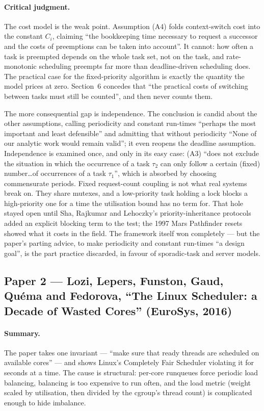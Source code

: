 \paragraph{Critical judgment.}
The cost model is the weak point. Assumption (A4) folds context-switch cost into the
constant $C_i$, claiming ``the bookkeeping time necessary to request a successor and the
costs of preemptions can be taken into account''. It cannot: how often a task is
preempted depends on the whole task set, not on the task, and rate-monotonic scheduling
preempts far more than deadline-driven scheduling does. The practical case for the
fixed-priority algorithm is exactly the quantity the model prices at zero. Section~6
concedes that ``the practical costs of switching between tasks must still be counted'',
and then never counts them.

The more consequential gap is independence. The conclusion is candid about the other
assumptions, calling periodicity and constant run-times ``perhaps the most important and
least defensible'' and admitting that without periodicity ``None of our analytic work
would remain valid''; it even reopens the deadline assumption. Independence is examined
once, and only in its easy case: (A3) ``does not exclude the situation in which the
occurrence of a task $\tau_2$ can only follow a certain (fixed) number\ldots of
occurrences of a task $\tau_1$'', which is absorbed by choosing commensurate periods.
Fixed request-count coupling is not what real systems break on. They share mutexes, and a
low-priority task holding a lock blocks a high-priority one for a time the utilisation
bound has no term for. That hole stayed open until Sha, Rajkumar and Lehoczky's
priority-inheritance protocols added an explicit blocking term to the test; the 1997
Mars Pathfinder resets showed what it costs in the field. The framework itself won
completely --- but the paper's parting advice, to make periodicity and constant
run-times ``a design goal'', is the part practice discarded, in favour of sporadic-task
and server models.

\subsection*{Paper 2 --- Lozi, Lepers, Funston, Gaud, Qu\'ema and Fedorova,
``The Linux Scheduler: a Decade of Wasted Cores'' (EuroSys, 2016)}

\paragraph{Summary.}
The paper takes one invariant --- ``make sure that ready threads are scheduled on
available cores'' --- and shows Linux's Completely Fair Scheduler violating it for
seconds at a time. The cause is structural: per-core runqueues force periodic load
balancing, balancing is too expensive to run often, and the load metric (weight scaled
by utilisation, then divided by the cgroup's thread count) is complicated enough to hide
imbalance.

